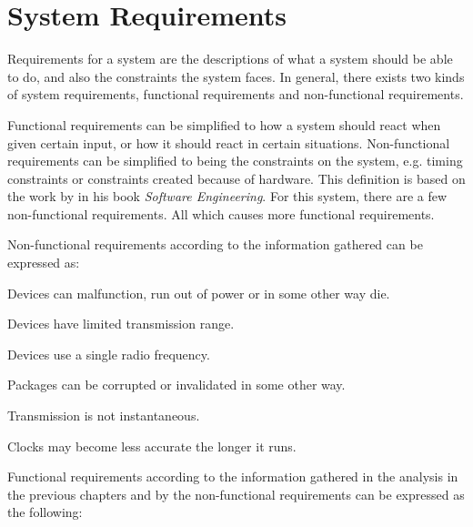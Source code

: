 \section{System Requirements}\label{requirements}
Requirements for a system are the descriptions of what a system should be able to do, and also the constraints the system faces.
In general, there exists two kinds of system requirements, functional requirements and non-functional requirements. 

Functional requirements can be simplified to how a system should react when given certain input, or how it should react in certain situations.
Non-functional requirements can be simplified to being the constraints on the system, e.g. timing constraints or constraints created because of hardware.
This definition is based on the work by \citet[see][chapter 4]{SEBook} in his book \textit{Software Engineering}.
For this system, there are a few non-functional requirements. All which causes more functional requirements.

\bigskip \noindent
Non-functional requirements according to the information gathered can be expressed as:
\begin{enumberate}
    \item Devices can malfunction, run out of power or in some other way die.
    \item Devices have limited transmission range.
    \item Devices use a single radio frequency.
    \item Packages can be corrupted or invalidated in some other way.
    \item Transmission is not instantaneous.
    \item Clocks may become less accurate the longer it runs.
\end{enumberate}

\noindent
Functional requirements according to the information gathered in the analysis in the previous chapters and by the non-functional requirements can be expressed as the following: 

